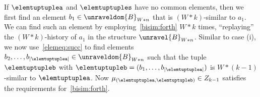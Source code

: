 \begin{proofsketch}
\begin{romanenumerate}
    \item
    If $\elemtuptuplea$ and $\elemtuptuples$ have no common elements, then we first find an element $b_{1} \in \unraveldom{B}_{W * n}$ that is $(W * k)$-similar to $a_{1}$.
    We can find such an element by employing~\ref{bisim:forth} $W * k$ times, ``replaying'' the $(W*k)$-history of $a_{1}$ in the structure $\unravel{B}_{W * n}$.
    Similar to case (i), we now use~\ref{elemeq:succ} to find elements $b_{2}, \ldots, b_{|\elemtuptuplea|} \in \unraveldom{B}_{W * n}$ such that the tuple $\elemtuptupleb$ with $\elemtuptupleb = (b_{1}, \ldots, b_{|\elemtuptuplea|})$ is $W * (k - 1)$-similar to $\elemtuptuplea$.
    Now $\mu_{(\elemtuptuplea, \elemtuptupleb)} \in Z_{k-1}$ satisfies the requirements for~\ref{bisim:forth}.
  \end{romanenumerate}
\end{proofsketch}
\else
